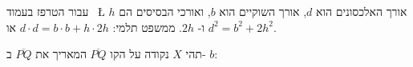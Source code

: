 %



עבור הטרפז בעמוד~%
\L{\pageref{p.ptolemy}}
אורך האלכסונים הוא
$d$,
אורך השוקיים הוא
$b$,
ואורכי הבסיסים הם
$h$
ו-%
$2h$.
ממשפט תלמי:
$d\cdot d = b\cdot b + h\cdot 2h$
או
$d^2=b^2+2h^2$.

תהי
$X$
נקודה על הקו
$\overline{PQ}$
המאריך את
$\overline{PQ}$
ב-%
$b$:


